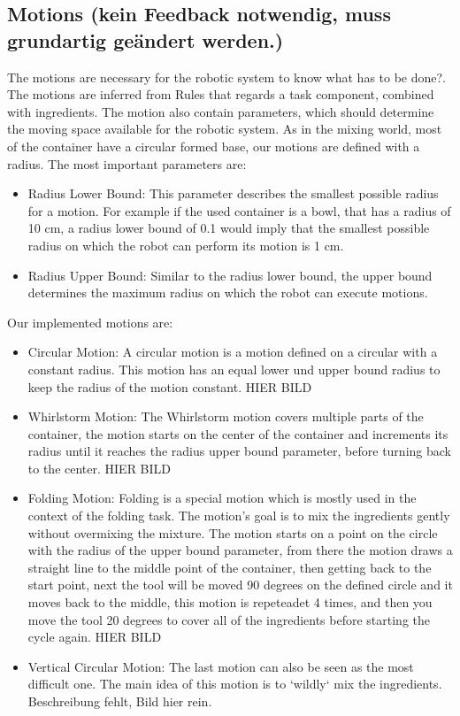 \subsection{Motions (kein Feedback notwendig, muss grundartig geändert werden.)}
The motions are necessary for the robotic system to know what has to be done?. The motions are inferred from Rules that regards a task component, combined with ingredients.
The motion also contain parameters, which should determine the moving space available for the robotic system. As in the mixing world, most of the container have a circular formed base, our motions are defined with a radius.
The most important parameters are:
\begin{itemize}
    \item Radius Lower Bound: This parameter describes the smallest possible radius for a motion. For example if the used container is a bowl, that has a radius of 10 cm, a radius lower bound of 0.1 would imply that the smallest possible radius on which the robot can perform its motion is 1 cm.
    \item Radius Upper Bound: Similar to the radius lower bound, the upper bound determines the maximum radius on which the robot can execute motions.
\end{itemize}
Our implemented motions are:
\begin{itemize}
    \item Circular Motion: A circular motion is a motion defined on a circular with a constant radius. This motion has an equal lower und upper bound radius to keep the radius of the motion constant.  \newline HIER BILD
    \item Whirlstorm Motion: The Whirlstorm motion covers multiple parts of the container, the motion starts on the center of the container and increments its radius until it reaches the radius upper bound parameter, before turning back to the center. \newline HIER BILD
    \item Folding Motion: Folding is a special motion which is mostly used in the context of the folding task. The motion's goal is to mix the ingredients gently without overmixing the mixture. The motion starts on a point on the circle with the radius of the upper bound parameter, from there the motion draws a straight line to the middle point of the container, then getting back to the start point, next the tool will be moved 90 degrees on the defined circle and it moves back to the middle, this motion is repeteadet 4 times, and then you move the tool 20 degrees to cover all of the ingredients before starting the cycle again. \newline HIER BILD
    \item Vertical Circular Motion: The last motion can also be seen as the most difficult one. The main idea of this motion is to `wildly` mix the ingredients. Beschreibung fehlt, Bild hier rein.
\end{itemize}

